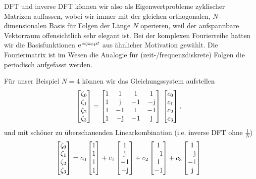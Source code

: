 DFT und inverse DFT können wir also als Eigenwertprobleme
zyklischer Matrizen auffassen, wobei
wir immer mit der gleichen orthogonalen, $N$-dimensionalen Basis
für Folgen der Länge $N$ operieren, weil der aufspannbare Vektorraum
offensichtlich sehr elegant ist. Bei der komplexen Fourierreihe hatten wir die Basisfunktionen $\e^{\pm\im\omega_0 \mu t}$ aus ähnlicher Motivation gewählt.
Die Fouriermatrix ist im Wesen die Analogie für (zeit-/frequenzdiskrete)
Folgen die periodisch aufgefasst werden.

Für unser Beispiel $N=4$ können wir das Gleichungssystem aufstellen
\begin{align}
\begin{bmatrix}
\zeta_0 \\ \zeta_1 \\ \zeta_2 \\ \zeta_3
\end{bmatrix}
=
\begin{bmatrix}
1 & 1 & 1 & 1 \\
1 & \im & -1 & -\im \\
1 & -1 & 1 & -1 \\
1 & -\im & -1 & \im
\end{bmatrix}
\,
\begin{bmatrix}
c_0 \\ c_1 \\ c_2 \\ c_3
\end{bmatrix},
\end{align}
und mit schöner zu überschauenden Linearkombination (i.e. inverse DFT ohne $\frac{1}{N}$)
\begin{align}
\begin{bmatrix}
\zeta_0 \\ \zeta_1 \\ \zeta_2 \\ \zeta_3
\end{bmatrix}
=
c_0
\begin{bmatrix}
1\\1\\1\\1
\end{bmatrix}+
c_1
\begin{bmatrix}
1\\\im\\-1\\-\im
\end{bmatrix}+
c_2
\begin{bmatrix}
1\\-1\\1\\-1
\end{bmatrix}+
c_3
\begin{bmatrix}
1\\-\im\\-1\\\im
\end{bmatrix}
\end{align}

